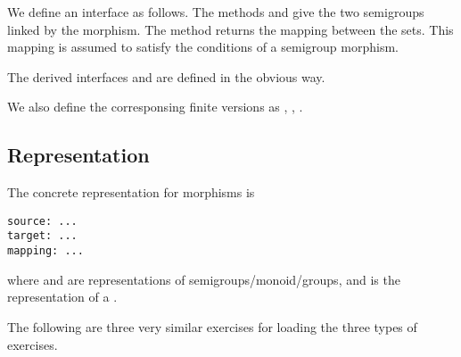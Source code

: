 
We define an interface  as follows.
The methods  and  give the two semigroups linked by the morphism.
The method  returns the mapping between the sets.
This mapping is assumed to satisfy the conditions of a semigroup morphism.


The derived interfaces  and  are defined in the obvious way.


We also define the corresponsing finite versions as ,
, .


\subsection{Representation}

The concrete representation for morphisms is
\begin{verbatim}
source: ...
target: ...
mapping: ...
\end{verbatim}
where  and  are representations of semigroups/monoid/groups,
and  is the representation of a .

The following are three very similar exercises for loading the three types of exercises.


\begin{widepar}
\end{widepar}


\begin{widepar}
\end{widepar}

